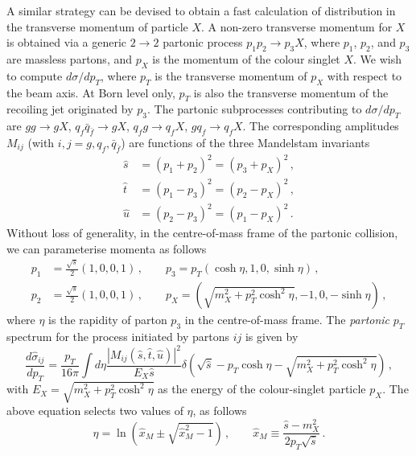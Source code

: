\documentclass[12pt]{article}
\begin{document}
A similar strategy can be devised to obtain a fast calculation of
distribution in the transverse momentum of particle $X$. A non-zero
transverse momentum for $X$ is obtained via a generic $2\to 2$
partonic process $p_1 p_2 \to p_3 X$, where $p_1$, $p_2$, and $p_3$ are massless
partons, and $p_X$ is the momentum of the colour singlet $X$. We
wish to compute $d\sigma/dp_T$, where $p_T$ is the transverse momentum
of $p_X$ with respect to the beam axis. At Born level only, $p_T$ is
also the transverse momentum of the recoiling jet originated by
$p_3$. The partonic subprocesses contributing to $d\sigma/dp_T$ are
$gg\to g X$, $q_f \bar q_{\bar f} \to g X$, $q_f g\to q_f X$,
$gq_f \to q_fX$. The corresponding amplitudes $M_{ij}$ (with
$i,j=g,q_f,\bar q_{\bar f}$) are functions of the three Mandelstam
invariants
\begin{equation}
  \label{eq:Mandelstam}
  \begin{split}
  \hat s & = (p_1+p_2)^2 = (p_3+p_X)^2 \,,\\
  \hat t & = (p_1-p_3)^2 = (p_2-p_X)^2 \,,\\
  \hat u & = (p_2-p_3)^2 = (p_1-p_X)^2 \,.
  \end{split}
\end{equation}
Without loss of generality, in the centre-of-mass frame of the
partonic collision, we can parameterise momenta as follows
\begin{equation}
  \label{eq:momenta}
  \begin{split}
  p_1&=\frac{\sqrt s}{2}(1,0,0,1)\,,\qquad p_3 = p_T(\cosh\eta,1,0,\sinh\eta)\,,\\
  p_2&=\frac{\sqrt s}{2}(1,0,0,1)\,,\qquad p_X = \left ( \sqrt{m_X^2+p^2_T\cosh^2\eta},-1,0,-\sinh\eta \right ) \,,
  \end{split}
\end{equation}
where $\eta$ is the rapidity of parton $p_3$ in the
centre-of-mass frame. The {\em partonic} $p_T$ spectrum for the
process initiated by partons $ij$ is given by
\begin{equation}
  \label{eq:partonic-pt}
  \frac{d\hat \sigma_{ij}}{dp_T} = \frac{p_T}{16\pi}\int d\eta \frac{|M_{ij}(\hat s,\hat t,\hat u)|^2}{E_X \hat s} \delta\left(\sqrt{\hat s} - p_T\cosh\eta-\sqrt{m_X^2+p^2_T\cosh^2\eta}\right)\,, 
\end{equation}
with $E_X=\sqrt{m_X^2+p^2_T\cosh^2\eta}$ as the energy of the colour-singlet
particle $p_X$.  The above equation selects two values of $\eta$, as
follows
\begin{equation}
\label{eq:eta-values}
  \eta = \ln\left(\hat x_M \pm \sqrt{\hat x_M^2-1}\right)\,,\qquad \hat x_M\equiv\frac{\hat s-m_X^2}{2 p_T \sqrt{\hat s} }\,.
\end{equation}
\end{document}
